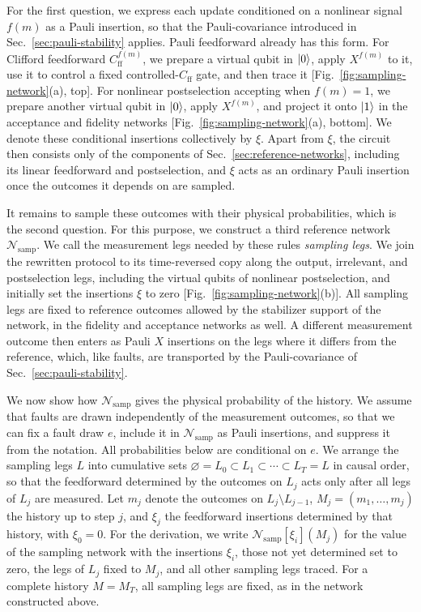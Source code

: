 \documentclass[aps,prx,twocolumn,superscriptaddress,longbibliography]{revtex4-2}
\begin{document}
For the first question, we express each update conditioned on a nonlinear signal $f(m)$
as a Pauli insertion, so that the Pauli-covariance introduced in Sec.~\ref{sec:pauli-stability} applies.
Pauli feedforward already has this form.
For Clifford feedforward $C_{\text{ff}}^{f(m)}$, we prepare a virtual qubit in $\ket0$,
apply $X^{f(m)}$ to it, use it to control a fixed controlled-$C_{\text{ff}}$ gate, and then trace it
[Fig.~\ref{fig:sampling-network}(a), top].
For nonlinear postselection accepting when $f(m)=1$,
we prepare another virtual qubit in $\ket0$, apply $X^{f(m)}$,
and project it onto $\ket1$ in the acceptance and fidelity networks
[Fig.~\ref{fig:sampling-network}(a), bottom].
We denote these conditional insertions collectively by $\xi$.
Apart from $\xi$, the circuit then consists only of the components of Sec.~\ref{sec:reference-networks},
including its linear feedforward and postselection,
and $\xi$ acts as an ordinary Pauli insertion once the outcomes it depends on are sampled.

It remains to sample these outcomes with their physical probabilities,
which is the second question.
For this purpose, we construct a third reference network $\mathcal N_{\text{samp}}$.
We call the measurement legs needed by these rules \emph{sampling legs}.
We join the rewritten protocol to its time-reversed copy along the output, irrelevant,
and postselection legs, including the virtual qubits of nonlinear postselection,
and initially set the insertions $\xi$ to zero [Fig.~\ref{fig:sampling-network}(b)].
All sampling legs are fixed to reference outcomes allowed by the stabilizer support of the network,
in the fidelity and acceptance networks as well.
A different measurement outcome then enters as Pauli $X$ insertions on the legs where it differs from the reference,
which, like faults, are transported by the Pauli-covariance of Sec.~\ref{sec:pauli-stability}.

We now show how $\mathcal N_{\text{samp}}$ gives the physical probability of the history.
We assume that faults are drawn independently of the measurement outcomes,
so that we can fix a fault draw $e$, include it in $\mathcal N_{\text{samp}}$ as Pauli insertions,
and suppress it from the notation.
All probabilities below are conditional on $e$.
We arrange the sampling legs $L$ into cumulative sets
$\varnothing=L_0\subset L_1\subset\cdots\subset L_T=L$ in causal order,
so that the feedforward determined by the outcomes on $L_j$ acts only after all legs of $L_j$ are measured.
Let $m_j$ denote the outcomes on $L_j\setminus L_{j-1}$,
$M_j=(m_1,\ldots,m_j)$ the history up to step $j$,
and $\xi_j$ the feedforward insertions determined by that history, with $\xi_0=0$.
For the derivation, we write $\mathcal N_{\text{samp}}[\xi_i](M_j)$ for the value of the sampling network
with the insertions $\xi_i$, those not yet determined set to zero,
the legs of $L_j$ fixed to $M_j$, and all other sampling legs traced.
For a complete history $M=M_T$, all sampling legs are fixed, as in the network constructed above.
\end{document}
